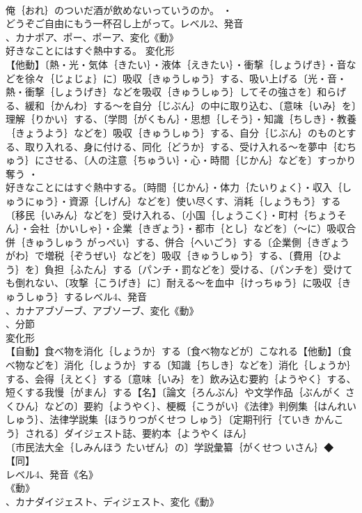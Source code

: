 \documentclass[8pt]{extreport}
\begin{document}
\begin{CJK}{UTF8}{min}
\\	俺｛おれ｝のついだ酒が飲めないっていうのか。 ・
\\	どうぞご自由にもう一杯召し上がって。レベル2、発音
\\	、カナポア、ポー、ポーア、変化《動》
\\	好きなことにはすぐ熱中する。	変化形 
\\	【他動】〔熱・光・気体｛きたい｝・液体｛えきたい｝・衝撃｛しょうげき｝・音などを徐々｛じょじょ｝に〕吸収｛きゅうしゅう｝する、吸い上げる〔光・音・熱・衝撃｛しょうげき｝などを吸収｛きゅうしゅう｝してその強さを〕和らげる、緩和｛かんわ｝する～を自分｛じぶん｝の中に取り込む、〔意味｛いみ｝を〕理解｛りかい｝する、〔学問｛がくもん｝・思想｛しそう｝・知識｛ちしき｝・教養｛きょうよう｝などを〕吸収｛きゅうしゅう｝する、自分｛じぶん｝のものとする、取り入れる、身に付ける、同化｛どうか｝する、受け入れる～を夢中｛むちゅう｝にさせる、〔人の注意｛ちゅうい｝・心・時間｛じかん｝などを〕すっかり奪う ・
\\	好きなことにはすぐ熱中する。〔時間｛じかん｝・体力｛たいりょく｝・収入｛しゅうにゅう｝・資源｛しげん｝などを〕使い尽くす、消耗｛しょうもう｝する〔移民｛いみん｝などを〕受け入れる、〔小国｛しょうこく｝・町村｛ちょうそん｝・会社｛かいしゃ｝・企業｛きぎょう｝・都市｛とし｝などを〕（～に）吸収合併｛きゅうしゅう がっぺい｝する、併合｛へいごう｝する〔企業側｛きぎょう がわ｝で増税｛ぞうぜい｝などを〕吸収｛きゅうしゅう｝する、〔費用｛ひよう｝を〕負担｛ふたん｝する〔パンチ・罰などを〕受ける、〔パンチを〕受けても倒れない、〔攻撃｛こうげき｝に〕耐える～を血中｛けっちゅう｝に吸収｛きゅうしゅう｝するレベル4、発音
\\	、カナアブゾーブ、アブソーブ、変化《動》
\\	、分節
\\	変化形 
\\	【自動】食べ物を消化｛しょうか｝する〔食べ物などが〕こなれる【他動】〔食べ物などを〕消化｛しょうか｝する〔知識｛ちしき｝などを〕消化｛しょうか｝する、会得｛えとく｝する〔意味｛いみ｝を〕飲み込む要約｛ようやく｝する、短くする我慢｛がまん｝する【名】〔論文｛ろんぶん｝や文学作品｛ぶんがく さくひん｝などの〕要約｛ようやく｝、梗概｛こうがい｝《法律》判例集｛はんれいしゅう｝、法律学説集｛ほうりつがくせつ しゅう｝〔定期刊行｛ていき かんこう｝される〕ダイジェスト誌、要約本｛ようやく ほん｝
\\	〔市民法大全｛しみんほう たいぜん｝の〕学説彙纂｛がくせつ いさん｝◆【同】
\\	レベル4、発音《名》
\\	《動》
\\	、カナダイジェスト、ディジェスト、変化《動》

\end{CJK}
\end{document}
